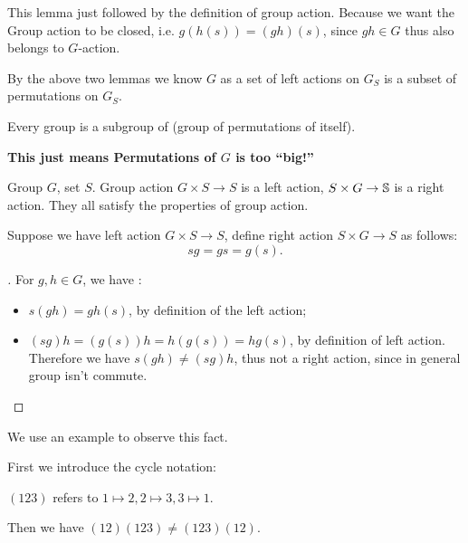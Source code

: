 \documentclass[11pt]{article}
\begin{document}
\begin{lemma}
This lemma just followed by the definition of group action. Because we want the Group action to be closed, i.e. \(g(h(s)) = (gh)(s)\), since \(gh \in G\) thus also belongs to \(G\)-action.
\end{lemma}

By the above two lemmas we know \(G\) as a set of left actions on \(G_S\) is a subset of permutations on \(G_S\).

\begin{theorem}
Every group is a subgroup of (group of permutations of itself).
\end{theorem}

\textbf{This just means Permutations of \(G\) is too ``big!''}

\begin{definition}
Group \(G\), set \(S\). Group action \(G \times S \to S\) is a left action, \(S \times G \to \S\) is a right action. They all satisfy the properties of group action.
\end{definition}

\begin{proposition}
Suppose we have left action \(G \times S \to S\), define right action \(S \times G \to S\) as follows:
\[
sg = gs = g(s).
\]
\end{proposition}

\begin{proof}[ ]
\leavevmode
For \(g, h \in G\), we have :
\begin{itemize}
\item \(s(gh) = gh(s)\), by definition of the left action;
\item \((sg)h = (g(s))h = h(g(s)) = hg(s)\), by definition of left action.
Therefore we have \(s(gh) \neq (sg)h\), thus not a right action, since in general group isn't commute.
\end{itemize}
\end{proof}

We use an example to observe this fact.

First we introduce the cycle notation:

\begin{definition}
\((123)\) refers to \(1 \mapsto 2, 2 \mapsto 3, 3 \mapsto 1\).
\end{definition}

Then we have \((12)(123) \neq (123)(12)\).
\end{document}
